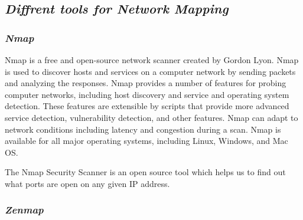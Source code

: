 \documentclass{article}
\begin{document}
\subsection{\textbf{\textit{Diffrent tools for Network Mapping}}}
\subsubsection{\textit{Nmap}}
Nmap is a free and open-source network scanner created by Gordon Lyon. Nmap is used to discover hosts and services on a computer network by sending packets and analyzing the responses. Nmap provides a number of features for probing computer networks, including host discovery and service and operating system detection. These features are extensible by scripts that provide more advanced service detection, vulnerability detection, and other features. Nmap can adapt to network conditions including latency and congestion during a scan. Nmap is available for all major operating systems, including Linux, Windows, and Mac OS.

The Nmap Security Scanner is an open source tool which helps us to find out what ports are open on any given IP address.
\subsubsection{\textit{Zenmap}}
\end{document}
